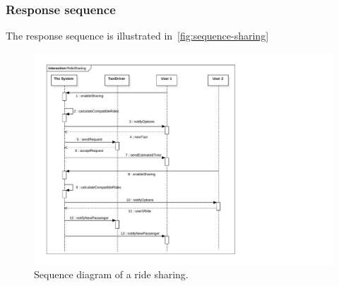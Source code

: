 \subsubsection{Response sequence}
The response sequence is illustrated in~\autoref{fig:sequence-sharing}

\begin{figure}
	\includegraphics[width=\textwidth]{diagrams/sequence_ride_sharing.pdf}
	\caption{Sequence diagram of a ride sharing.}
	\label{fig:sequence-sharing}
\end{figure}

